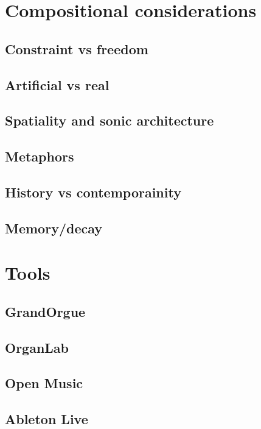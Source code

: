 \documentclass[12pt,twoside,maitrise]{dms}
\theoremstyle{definition}
\begin{document}
\section{Compositional considerations}

\subsection{Constraint vs freedom}

\subsection{Artificial vs real}

\subsection{Spatiality and sonic architecture}

\subsection{Metaphors}

\subsection{History vs contemporainity}

\subsection{Memory/decay}

\section{Tools}

\subsection{GrandOrgue}

\subsection{OrganLab}

\subsection{Open Music}

\subsection{Ableton Live}
\end{document}
